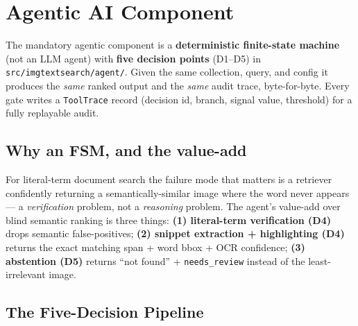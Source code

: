 \documentclass[12pt,a4paper]{article}
\begin{document}
\section{Agentic AI Component}

The mandatory agentic component is a \textbf{deterministic finite-state machine} (not an LLM agent) with \textbf{five decision points} (D1--D5) in \texttt{src/imgtextsearch/agent/}. Given the same collection, query, and config it produces the \emph{same} ranked output and the \emph{same} audit trace, byte-for-byte. Every gate writes a \texttt{ToolTrace} record (decision id, branch, signal value, threshold) for a fully replayable audit.

\subsection{Why an FSM, and the value-add}

For literal-term document search the failure mode that matters is a retriever confidently returning a semantically-similar image where the word never appears --- a \emph{verification} problem, not a \emph{reasoning} problem. The agent's value-add over blind semantic ranking is three things: \textbf{(1) literal-term verification (D4)} drops semantic false-positives; \textbf{(2) snippet extraction + highlighting (D4)} returns the exact matching span + word bbox + OCR confidence; \textbf{(3) abstention (D5)} returns ``not found'' + \texttt{needs\_review} instead of the least-irrelevant image.

\subsection{The Five-Decision Pipeline}
\end{document}
